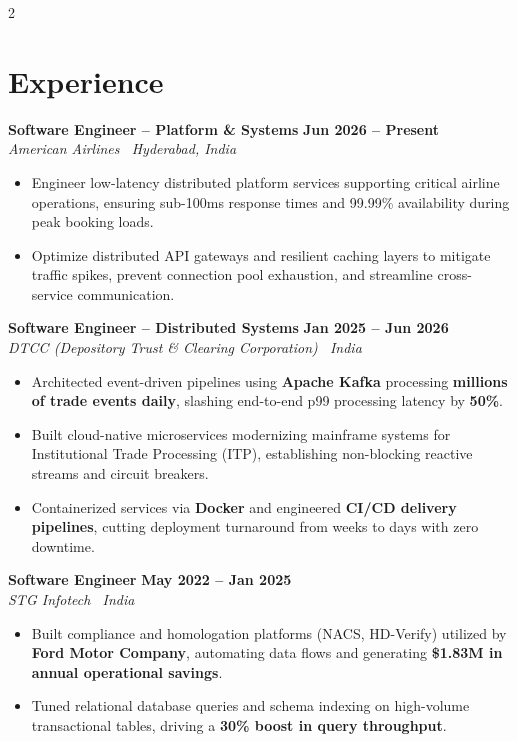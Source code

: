 \documentclass[10pt,letterpaper]{article}
\newcommand{\role}[3]{
    \textbf{#1} \hfill \textbf{#2} \\
    \textit{\small #3} \vspace{1pt}
}
\begin{document}
\begin{paracol}{2}


\section{Experience}

\role{Software Engineer -- Platform \& Systems}{Jun 2026 -- Present}{American Airlines \textbar\ Hyderabad, India}
\begin{itemize}
    \item Engineer low-latency distributed platform services supporting critical airline operations, ensuring sub-100ms response times and 99.99\% availability during peak booking loads.
    \item Optimize distributed API gateways and resilient caching layers to mitigate traffic spikes, prevent connection pool exhaustion, and streamline cross-service communication.
\end{itemize}

\vspace{3pt}

\role{Software Engineer -- Distributed Systems}{Jan 2025 -- Jun 2026}{DTCC (Depository Trust \& Clearing Corporation) \textbar\ India}
\begin{itemize}
    \item Architected event-driven pipelines using \textbf{Apache Kafka} processing \textbf{millions of trade events daily}, slashing end-to-end p99 processing latency by \textbf{50\%}.
    \item Built cloud-native microservices modernizing mainframe systems for Institutional Trade Processing (ITP), establishing non-blocking reactive streams and circuit breakers.
    \item Containerized services via \textbf{Docker} and engineered \textbf{CI/CD delivery pipelines}, cutting deployment turnaround from weeks to days with zero downtime.
\end{itemize}

\vspace{3pt}

\role{Software Engineer}{May 2022 -- Jan 2025}{STG Infotech \textbar\ India}
\begin{itemize}
    \item Built compliance and homologation platforms (NACS, HD-Verify) utilized by \textbf{Ford Motor Company}, automating data flows and generating \textbf{\$1.83M in annual operational savings}.
    \item Tuned relational database queries and schema indexing on high-volume transactional tables, driving a \textbf{30\% boost in query throughput}.
\end{itemize}


\end{paracol}
\end{document}
